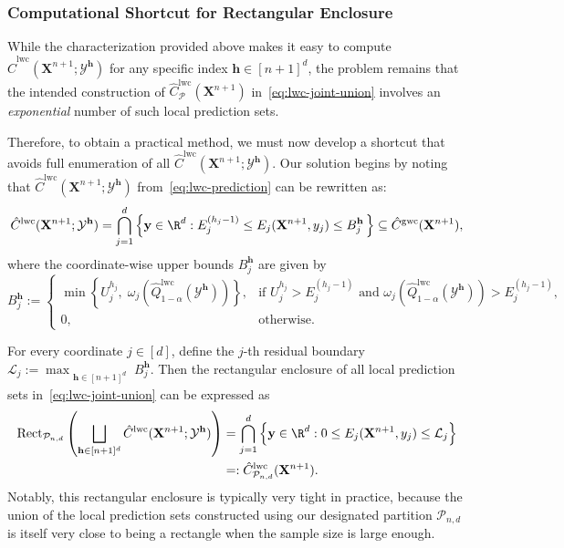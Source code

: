 \subsubsection{Computational Shortcut for Rectangular Enclosure}

{\color{blue}
While the characterization provided above makes it easy to compute $\hat{C}^{\mathrm{lwc}}(\mathbf{X}^{n+1};\mathcal{Y}^{\mathbf{h}})$ for any specific index $\mathbf{h} \in [n+1]^d$, the problem remains that the intended construction of $\hat{C}^{\mathrm{lwc}}_{\mathcal{P}}(\mathbf{X}^{n+1})$ in~\eqref{eq:lwc-joint-union} involves an {\em exponential} number of such local prediction sets.

Therefore, to obtain a practical method, we must now develop a shortcut that avoids full enumeration of all $\hat{C}^{\mathrm{lwc}}(\mathbf{X}^{n+1};\mathcal{Y}^{\mathbf{h}})$.
Our solution begins by noting that $\hat{C}^{\mathrm{lwc}}(\mathbf{X}^{n+1};\mathcal{Y}^{\mathbf{h}})$ from~\eqref{eq:lwc-prediction} can be rewritten as:
\[
\hat{C}^\mathrm{lwc}(\mathbf{X}^{n+1}; \mathcal{Y}^{\mathbf{h}}) = \bigcap_{j=1}^d \left\{ \mathbf y\in\R^d : E^{(h_j-1)}_j \leq E_j(\mathbf{X}^{n+1},y_j) \leq B^{\mathbf{h}}_j \,\right\} \subseteq \hat{C}^\mathrm{gwc}(\mathbf{X}^{n+1}),
\]
where the coordinate-wise upper bounds $B^{\mathbf{h}}_j$ are given by
\begin{equation} \label{eq:rect-wise-bounds}
B^{\mathbf{h}}_j :=
\begin{cases}
\min\left\{U^{h_j}_j,\; \omega_j(\hat{Q}^{\mathrm{lwc}}_{1-\alpha}(\mathcal{Y}^{\mathbf{h}}))\right\},
& \text{if } U^{h_j}_j > E^{(h_j-1)}_j \text{ and } \omega_j(\hat{Q}^{\mathrm{lwc}}_{1-\alpha}(\mathcal{Y}^{\mathbf{h}})) > E^{(h_j-1)}_j,\\[0.4em]
0, & \text{otherwise.}
\end{cases}
\end{equation}

For every coordinate $j \in [d]$, define the $j$-th residual boundary $\mathcal{L}_j := \max_{\substack{\mathbf{h} \in [n+1]^d}}B^{\mathbf{h}}_j$.
Then the rectangular enclosure of all local prediction sets in~\eqref{eq:lwc-joint-union} can be expressed as
\begin{equation}
\begin{aligned}
    \mathrm{Rect}_{\mathcal{P}_{n,d}}\left(\bigsqcup_{\mathbf{h} \in [n+1]^d} \hat{C}^\mathrm{lwc}(\mathbf{X}^{n+1};\mathcal{Y}^{\mathbf{h}})\right) &= \bigcap_{j=1}^d \left\{ \mathbf y\in\R^d : 0 \leq E_j(\mathbf{X}^{n+1},y_j) \leq \mathcal{L}_j \right\}\\
&=: \hat{C}^\mathrm{lwc}_{\mathcal{P}_{n,d}}(\mathbf{X}^{n+1}).
\end{aligned}
\end{equation}
Notably, this rectangular enclosure is typically very tight in practice, because the union of the local prediction sets constructed using our designated partition $\mathcal{P}_{n,d}$ is itself very close to being a rectangle when the sample size is large enough.}

